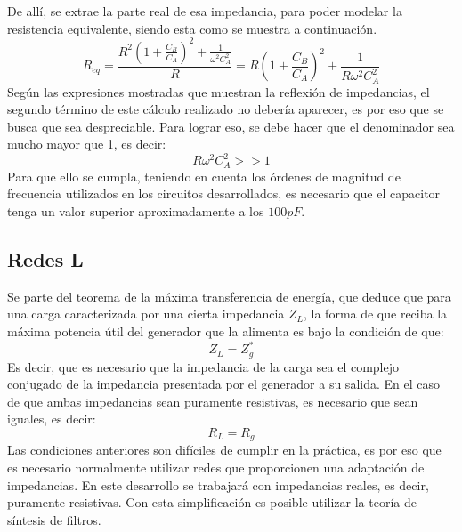 \documentclass{article}
\begin{document}
\noindent De allí, se extrae la parte real de esa impedancia, para poder modelar la resistencia equivalente, siendo esta como se muestra a continuación.
\begin{equation*}
    R_{eq} = \frac{R^2 \left( 1 + \frac{C_B}{C_A} \right)^2 + \frac{1}{\omega^2 C_A^2}}{R} = R \left( 1 + \frac{C_B}{C_A} \right)^2 + \frac{1}{R\omega^2C_A^2}
\end{equation*}
\noindent Según las expresiones mostradas que muestran la reflexión de impedancias, el segundo término de este cálculo realizado no debería aparecer, es por eso que se busca que sea despreciable. Para lograr eso, se debe hacer que el denominador sea mucho mayor que 1, es decir:
\begin{equation*}
    R\omega ^2 C_A^2 >> 1
\end{equation*}
\noindent Para que ello se cumpla, teniendo en cuenta los órdenes de magnitud de frecuencia utilizados en los circuitos desarrollados, es necesario que el capacitor tenga un valor superior aproximadamente a los $100 pF$.
\subsection{Redes L}
Se parte del teorema de la máxima transferencia de energía, que deduce que para una carga caracterizada por una cierta impedancia $Z_L$, la forma de que reciba la máxima potencia útil del generador que la alimenta es bajo la condición de que:
\begin{equation*}
    Z_L = Z_g^*
\end{equation*}
\noindent Es decir, que es necesario que la impedancia de la carga sea el complejo conjugado de la impedancia presentada por el generador a su salida. En el caso de que ambas impedancias sean puramente resistivas, es necesario que sean iguales, es decir:
\begin{equation*}
    R_L = R_g
\end{equation*}
Las condiciones anteriores son difíciles de cumplir en la práctica, es por eso que es necesario normalmente utilizar redes que proporcionen una adaptación de impedancias. En este desarrollo se trabajará con impedancias reales, es decir, puramente resistivas. Con esta simplificación es posible utilizar la teoría de síntesis de filtros.
\end{document}
